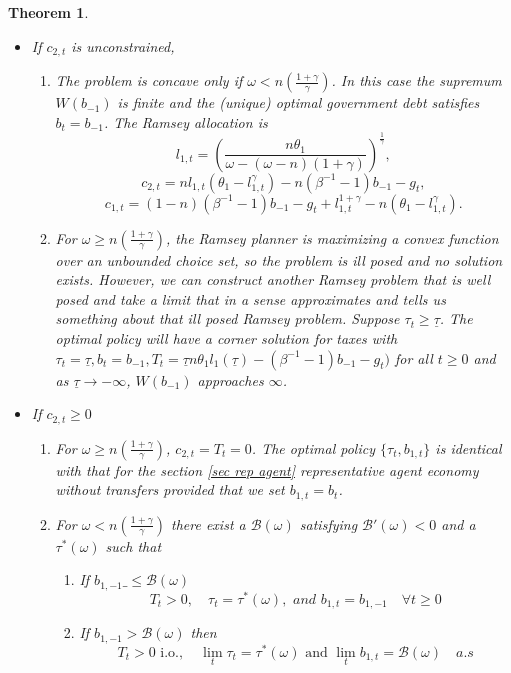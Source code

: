 \documentclass[thmsb,11pt]{article}
\newtheorem{theorem}{Theorem}
\begin{document}
\begin{theorem}
\begin{itemize}
\item If $c_{2,t}$ is unconstrained,
\begin{enumerate}

\item The problem is concave only if $\omega<n \left(\frac{1+\gamma}{\gamma}\right)$. In this case the supremum $W(b_{-1})$ is finite and the (unique) optimal government  debt satisfies  $b_{t}=b_{-1}$. The Ramsey allocation is
\[l_{1,t}=\left(\frac{n\theta_1}{\omega-(\omega-n)(1+\gamma)}\right)^{\frac{1}{\gamma}},\]\[c_{2,t}=nl_{1,t}(\theta_1-l_{1,t}^{\gamma})-n (\beta^{-1}-1)b_{-1}-g_t,\]\[c_{1,t}=(1-n)(\beta^{-1}-1)b_{-1}-g_t+l_{1,t}^{1+\gamma}-n(\theta_1-l^{\gamma}_{1,t}).\]
\item For $\omega\geq n \left(\frac{1+\gamma}{\gamma}\right)$, the Ramsey planner is maximizing  a convex function over an unbounded choice set, so the problem is ill posed and no solution exists. However, we can construct another Ramsey problem that is well posed and
    take a limit that in a sense approximates and tells us something about  that ill posed Ramsey problem.  Suppose $\tau_t\geq \underline{\tau}$. The optimal policy will have a corner solution for taxes with $\tau_t=\underline{\tau},b_t=b_{-1}, T_t=\underline{\tau}n\theta_1 l_1(\underline{\tau})-(\beta^{-1}-1)b_{-1}-g_t)$ for all $t\geq 0$ and as $\underline{\tau}\to -\infty$, $W(b_{-1})$ approaches $\infty$.
\end{enumerate}
\item If $c_{2,t}\geq 0 $

\begin{enumerate}
 \item For $\omega\geq n \left(\frac{1+\gamma}{\gamma}\right)$,  $c_{2,t} = T_t=0$.  The optimal policy $\{\tau_t,b_{1,t}\}$ is  identical
 with that for the section \ref{sec rep agent} representative agent economy without transfers provided that we set  $b_{1,t}=b_t$.
   \item For $\omega< n \left(\frac{1+\gamma}{\gamma}\right)$ there exist  a $\mathcal{B}(\omega)$  satisfying $\mathcal{B}'(\omega)<0$ and a $\tau^*(\omega)$ such that
 \begin{enumerate}
  \item If $b_{1,-1}\_\leq \mathcal{B(\omega)}$
\[T_t>0, \quad \tau_t=\tau^*(\omega), \textit{ and } b_{1,t}=b_{1,-1} \quad \forall t \geq 0 \]
\item If $b_{1,-1}> \mathcal{B(\omega)}$ then
   \[ T_t>0 \text{ i.o.},\quad \lim_t\tau_t=\tau^*(\omega) \text{ and } \lim_tb_{1,t}=\mathcal{B}(\omega)\quad \textit{a.s}\]
\end{enumerate}

\end{enumerate}
 \end{itemize}

\end{theorem}
\end{document}
